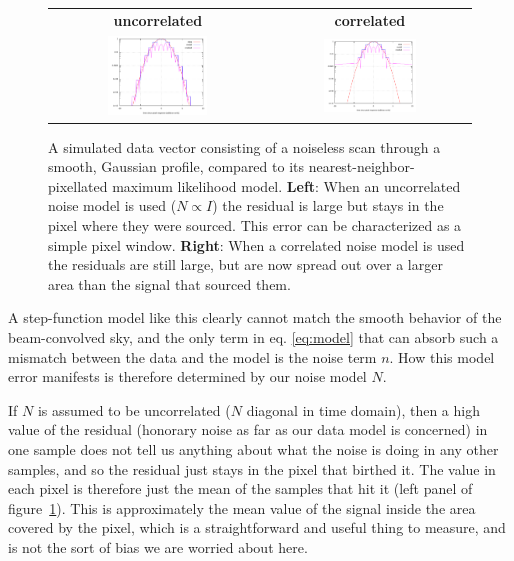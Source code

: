 \documentclass{article}
\newcommand{\dfn}[1]{\textbf{#1}}
\begin{document}
\begin{figure}[ph!]
	\centering
	\begin{tabular}{cc}
		\bf uncorrelated & \bf correlated \\
		\includegraphics[width=0.48\textwidth]{examples/src_1d_uncorr_tod_log.pdf} &
		\includegraphics[width=0.48\textwidth]{examples/src_1d_corr_tod_log.pdf}
	\end{tabular}
	\caption{A simulated data vector consisting of a noiseless scan through a smooth, Gaussian profile,
		compared to its nearest-neighbor-pixellated maximum likelihood
		model. \dfn{Left}: When an uncorrelated noise model is used ($N \propto I$)
		the residual is large but stays in the pixel where they were sourced. This error can
		be characterized as a simple pixel window. \dfn{Right}: When a correlated noise
		model is used the residuals are still large, but are now spread out over a larger area
		than the signal that sourced them.}
		\label{fig:subpix1d}
\end{figure}

A step-function model like this clearly cannot match the smooth behavior of the beam-convolved
sky, and the only term in eq. \ref{eq:model} that can absorb such a mismatch between the data
and the model is the noise term $n$. How this model error manifests is therefore determined by
our noise model $N$.

If $N$ is assumed to be uncorrelated ($N$ diagonal in time domain), then a high value of the residual
(honorary noise as far as our data model is concerned) in one sample does not tell us
anything about what the noise is doing in any other samples, and so the residual
just stays in the pixel that birthed it. The value in each pixel is therefore just
the mean of the samples that hit it (left panel of figure~\ref{fig:subpix1d}).
This is approximately
the mean value of the signal inside the area covered by the pixel, which is a straightforward
and useful thing to measure, and is not the sort of bias we are worried about here.
\end{document}
